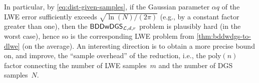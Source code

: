 In particular, by \autoref{eq:dist-given-samples}, if the
Gaussian parameter $\alpha q$ of the LWE error sufficiently exceeds
$\sqrt{\ln(N)/(2\pi)}$ (e.g., by a constant factor greater than one),
then the $\mathsf{BDDwDGS}_{\mathcal{L},d,r}$ problem is plausibly hard (in the
worst case), hence so is the corresponding LWE problem from
\autoref{thm:bddwdgs-to-dlwe} (on the average).  An interesting
direction is to obtain a more precise bound on, and improve, the
``sample overhead'' of the reduction, i.e., the $\text{poly}(n)$
factor connecting the number of LWE samples~$m$ and the number of DGS
samples~$N$.

